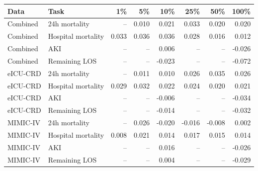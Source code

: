 \begin{tabular}{llrrrrrr}
\toprule
Data & Task & 1\% & 5\% & 10\% & 25\% & 50\% & 100\% \\
\midrule
Combined & 24h mortality & -- & 0.010 & 0.021 & 0.033 & 0.020 & 0.020 \\
Combined & Hospital mortality & 0.033 & 0.036 & 0.036 & 0.028 & 0.016 & 0.012 \\
Combined & AKI & -- & -- & 0.006 & -- & -- & -0.026 \\
Combined & Remaining LOS & -- & -- & -0.023 & -- & -- & -0.072 \\
eICU-CRD & 24h mortality & -- & 0.011 & 0.010 & 0.026 & 0.035 & 0.026 \\
eICU-CRD & Hospital mortality & 0.029 & 0.032 & 0.022 & 0.024 & 0.020 & 0.021 \\
eICU-CRD & AKI & -- & -- & -0.006 & -- & -- & -0.034 \\
eICU-CRD & Remaining LOS & -- & -- & -0.014 & -- & -- & -0.032 \\
MIMIC-IV & 24h mortality & -- & 0.026 & -0.020 & -0.016 & -0.008 & 0.002 \\
MIMIC-IV & Hospital mortality & 0.008 & 0.021 & 0.014 & 0.017 & 0.015 & 0.014 \\
MIMIC-IV & AKI & -- & -- & 0.016 & -- & -- & -0.026 \\
MIMIC-IV & Remaining LOS & -- & -- & 0.004 & -- & -- & -0.029 \\
\bottomrule
\end{tabular}
